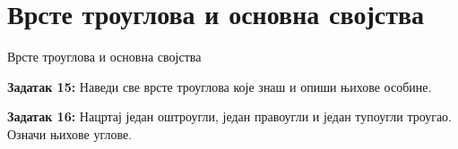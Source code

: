 \documentclass[12pt]{beamer}
\begin{document}
\section{Врсте троуглова и основна својства}
\begin{frame}{Врсте троуглова и основна својства}

\textbf{Задатак 15:}
Наведи све врсте троуглова које знаш и опиши њихове особине.

\textbf{Задатак 16:}
Нацртај један оштроугли, један правоугли и један тупоугли троугао.
Означи њихове углове.

\end{frame}
\end{document}
